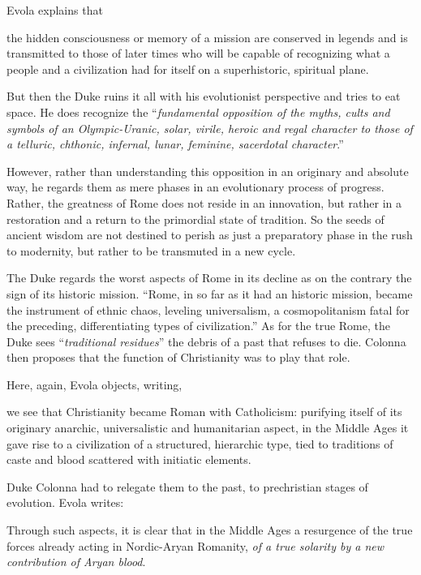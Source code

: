 Evola explains that

\begin{quotex}
the hidden consciousness or memory of a mission are conserved in legends and is transmitted to those of later times who will be capable of recognizing what a people and a civilization had for itself on a superhistoric, spiritual plane.
\end{quotex}

But then the Duke ruins it all with his evolutionist perspective and tries to eat space. He does recognize the ``\emph{fundamental opposition of the myths, cults and symbols of an Olympic-Uranic, solar, virile, heroic and regal character to those of a telluric, chthonic, infernal, lunar, feminine, sacerdotal character}.''

However, rather than understanding this opposition in an originary and absolute way, he regards them as mere phases in an evolutionary process of progress. Rather, the greatness of Rome does not reside in an innovation, but rather in a restoration and a return to the primordial state of tradition. So the seeds of ancient wisdom are not destined to perish as just a preparatory phase in the rush to modernity, but rather to be transmuted in a new cycle.

The Duke regards the worst aspects of Rome in its decline as on the contrary the sign of its historic mission. ``Rome, in so far as it had an historic mission, became the instrument of ethnic chaos, leveling universalism, a cosmopolitanism fatal for the preceding, differentiating types of civilization.'' As for the true Rome, the Duke sees ``\emph{traditional residues}'' the debris of a past that refuses to die. Colonna then proposes that the function of Christianity was to play that role.

Here, again, Evola objects, writing,

\begin{quotex}
we see that Christianity became Roman with Catholicism: purifying itself of its originary anarchic, universalistic and humanitarian aspect, in the Middle Ages it gave rise to a civilization of a structured, hierarchic type, tied to traditions of caste and blood scattered with initiatic elements.
\end{quotex}


Duke Colonna had to relegate them to the past, to prechristian stages of evolution. Evola writes:

\begin{quotex}
Through such aspects, it is clear that in the Middle Ages a resurgence of the true forces already acting in Nordic-Aryan Romanity, \emph{of a true solarity by a new contribution of Aryan blood}.
\end{quotex}


